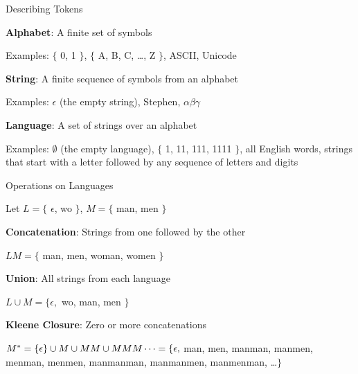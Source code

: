 \documentclass{plt}
\begin{document}
\begin{frame}{Describing Tokens}

\textbf{Alphabet}: A finite set of symbols

Examples: $\{$ 0, 1 $\}$, $\{$ A, B, C, \ldots, Z $\}$, ASCII, Unicode

\vspace{2pc}

\textbf{String}: A finite sequence of symbols from an alphabet

Examples: $\epsilon$ (the empty string), Stephen, $\alpha\beta\gamma$

\vspace{2pc}

\textbf{Language}: A set of strings over an alphabet

Examples: $\emptyset$ (the empty language), $\{$ 1, 11, 111, 1111
$\}$, all English words, strings that start with a letter followed by
any sequence of letters and digits

\end{frame}

\begin{frame}{Operations on Languages}

Let $L = \{$ $\epsilon$, wo $\}$, $M = \{$ man, men $\}$

\vspace{2pc}

\textbf{Concatenation}: Strings from one followed by the other

$LM = \{$ man, men, woman, women $\}$

\vspace{2pc}

\textbf{Union}: All strings from each language

$L \cup M = \{ \epsilon, $ wo, man, men $\}$

\vspace{2pc}

\textbf{Kleene Closure}: Zero or more concatenations

$M^* = \{ \epsilon \} \cup M \cup MM \cup MMM \cdots = \break
 \{ \epsilon, $ man, men, manman, manmen, menman, menmen,
manmanman, manmanmen, manmenman, \ldots $\}$

\end{frame}
\end{document}
